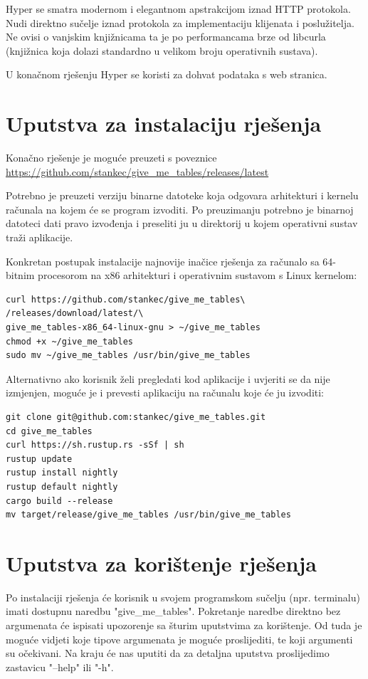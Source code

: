 \documentclass[times, utf8, zavrsni]{fer}
\begin{document}
Hyper se smatra modernom i elegantnom apstrakcijom iznad HTTP protokola.
Nudi direktno sučelje iznad protokola za implementaciju klijenata i
poslužitelja.
Ne ovisi o vanjskim knjižnicama ta je po performancama brze od libcurla
(knjižnica koja dolazi standardno u velikom broju operativnih sustava).

U konačnom rješenju Hyper se koristi za dohvat podataka s web stranica.

\section{Uputstva za instalaciju rješenja}

Konačno rješenje je moguće preuzeti s poveznice
\url{https://github.com/stankec/give_me_tables/releases/latest}

Potrebno je preuzeti verziju binarne datoteke koja odgovara arhitekturi i
kernelu računala na kojem će se program izvoditi. Po preuzimanju potrebno je
binarnoj datoteci dati pravo izvođenja i preseliti ju u direktorij u kojem
operativni sustav traži aplikacije.

Konkretan postupak instalacije najnovije inačice rješenja za računalo sa
64-bitnim procesorom na x86 arhitekturi i operativnim sustavom s Linux kernelom:

\begin{lstlisting}
curl https://github.com/stankec/give_me_tables\
/releases/download/latest/\
give_me_tables-x86_64-linux-gnu > ~/give_me_tables
chmod +x ~/give_me_tables
sudo mv ~/give_me_tables /usr/bin/give_me_tables
\end{lstlisting}

Alternativno ako korisnik želi pregledati kod aplikacije i uvjeriti se da nije
izmjenjen, moguće je i prevesti aplikaciju na računalu koje će ju izvoditi:

\begin{lstlisting}
git clone git@github.com:stankec/give_me_tables.git
cd give_me_tables
curl https://sh.rustup.rs -sSf | sh
rustup update
rustup install nightly
rustup default nightly
cargo build --release
mv target/release/give_me_tables /usr/bin/give_me_tables
\end{lstlisting}

\section{Uputstva za korištenje rješenja}

Po instalaciji rješenja će korisnik u svojem programskom sučelju
(npr. terminalu) imati dostupnu naredbu "give\_me\_tables". Pokretanje naredbe
direktno bez argumenata će ispisati upozorenje sa šturim uputstvima za
korištenje. Od tuda je moguće vidjeti koje tipove argumenata je moguće
proslijediti, te koji argumenti su očekivani. Na kraju će nas uputiti da za
detaljna uputstva proslijedimo zastavicu "--help" ili "-h".
\end{document}
